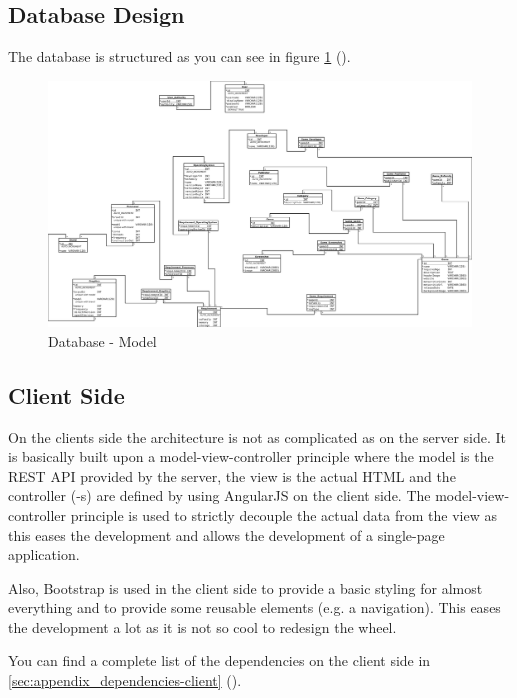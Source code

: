 \documentclass[12pt]{scrreprt}
\begin{document}
			\subsection{Database Design}
				\label{subsec:tb-concept_technical_database-design}

				The database is structured as you can see in figure \ref{fig:database_model} ().
				\begin{figure}
					\label{fig:database_model}
					\centering
					\includegraphics[width=\textwidth]{images/database/model.png}
					\caption{Database - Model}
				\end{figure}

			\subsection{Client Side}
				\label{subsec:tb-concept_technical_client-side}

				On the clients side the architecture is not as complicated as on the server side. It is basically built upon a model-view-controller principle where the model is the REST API provided by the server, the view is the actual HTML and the controller (-s) are defined by using AngularJS on the client side. The model-view-controller principle is used to strictly decouple the actual data from the view as this eases the development and allows the development of a single-page application.

				Also, Bootstrap is used in the client side to provide a basic styling for almost everything and to provide some reusable elements (e.g. a navigation). This eases the development a lot as it is not so cool to redesign the wheel.

				You can find a complete list of the dependencies on the client side in \ref{sec:appendix_dependencies-client} ().
\end{document}
